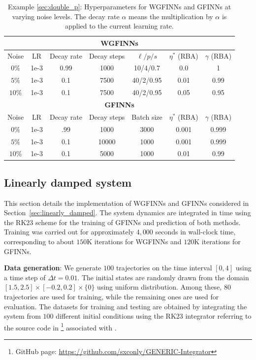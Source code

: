 \documentclass[final]{siamltex}
\begin{document}
\begin{appendices}
\begin{table}[!t]
\centering
\begin{tabular}{|c||c|c|c|c|c|c|}
\hline
\multicolumn{7}{|c|}{\textbf{WGFINNs}} \\
\hline
Noise  & LR & Decay rate & Decay steps & $\ell/p/s$ & $\eta^*$ (RBA) & $\gamma$ (RBA) \\
\hline
$0\%$ & 1e-3   & 0.99 & 1000 & 10/4/0.7  & 0.0 & 1 \\
\hline
$5\%$ & 1e-3  & 0.1 & 7500 & 40/2/0.95 & 0.01 &  0.99\\
\hline
$10\%$ & 1e-3  & 0.1 & 7500 & 40/2/0.95  & 0.05 & 0.95 \\
\hline\hline
\multicolumn{7}{|c|}{\textbf{GFINNs}} \\
\hline
Noise& LR & Decay rate & Decay steps & Batch size & $\eta^*$ (RBA) & $\gamma$ (RBA) \\
\hline
$0\%$ & 1e-3 & .99 & 1000 & 3000 & 0.001  & 0.999  \\
\hline
$5\%$ & 1e-3 & 0.1 & 10000 & 1000 & 0.001&  0.999 \\
\hline
$10\%$ & 1e-3 & 0.1 & 5000 & 1000 & 0.01  & 0.99  \\
\hline
\end{tabular}
\caption{Example \ref{sec:double_p}: Hyperparameters for WGFINNs and GFINNs at varying noise levels. The decay rate $\alpha$ means the multiplication by $\alpha$ is applied to the current learning rate.}
\label{tab:Hyperparameters_DP}
\end{table}


\subsection{Linearly damped system}
\label{sec:app_LD}
This section details the implementation of WGFINNs and GFINNs considered in Section~\ref{sec:linearly_damped}.
The system dynamics are integrated in time using the RK23 scheme for the training of GFINNs and prediction of both methods.
Training was carried out for approximately \(4{,}000\) seconds in wall-clock time, corresponding to about \(150\text{K}\) iterations for WGFINNs and \(120\text{K}\) iterations for GFINNs.

{\bf Data generation}: 
We generate $100$ trajectories on the time interval $[0,4]$ using a time step of $\Delta t = 0.01$.  
The initial states are randomly drawn from the domain $[1.5,2.5]\times[-0.2,0.2]\times\{0\}$ using uniform distribution.  
Among these, $80$ trajectories are used for training, while the remaining ones are used for evaluation.
The datasets for training and testing are obtained by integrating the system from $100$ different initial conditions using the RK23 integrator 
referring to the source code in \footnote{\label{ft:ld_github}GitHub page: \url{https://github.com/sxconly/GENERIC-Integrator}} associated with \cite{shang2020structure}.


\end{appendices}
\end{document}

